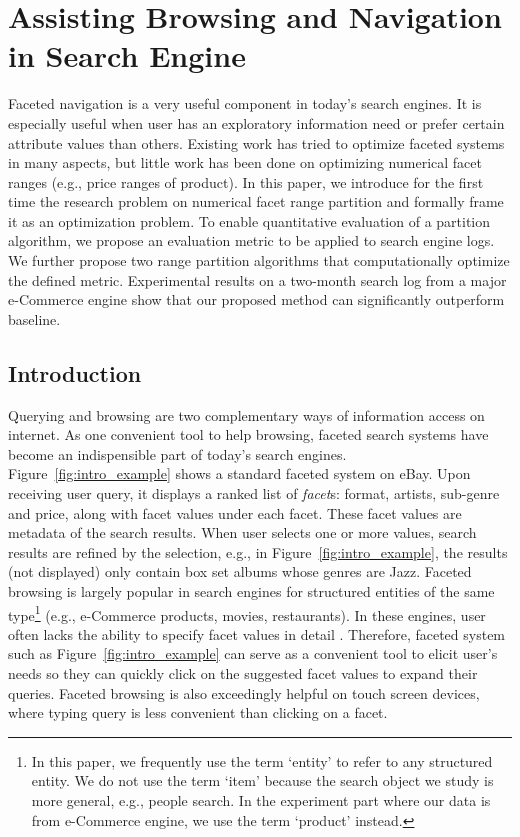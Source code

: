 
\chapter{Assisting Browsing and Navigation in Search Engine}
\label{ch:browsing}

Faceted navigation is a very useful component in today's search engines. It is especially useful when user has an exploratory information need or prefer certain attribute values than others. Existing work has tried to optimize faceted systems in many aspects, but little work has been done on optimizing numerical facet ranges (e.g., price ranges of product). In this paper, we introduce for the first time the research problem on numerical facet range partition and formally frame it as an optimization problem. To enable quantitative evaluation of a partition algorithm, we propose an evaluation metric to be applied to search engine logs. We further propose two range partition algorithms that computationally optimize the defined metric. Experimental results on a two-month search log from a major e-Commerce engine show that our proposed method can significantly outperform baseline.


\section{Introduction}
\label{sec:intro}

Querying and browsing are two complementary ways of information access on internet. As one convenient tool to help browsing, faceted search systems have become an indispensible part of today's search engines. Figure~\ref{fig:intro_example} shows a standard faceted system on eBay. Upon receiving user query, it displays a ranked list of \emph{facet}s: format, artists, sub-genre and price, along with facet values under each facet. These facet values are metadata of the search results. When user selects one or more values, search results are refined by the selection, e.g., in Figure~\ref{fig:intro_example}, the results (not displayed) only contain box set albums whose genres are Jazz. Faceted browsing is largely popular in search engines for structured entities of the same type\footnote{In this paper, we frequently use the term `entity' to refer to any structured entity. We do not use the term `item' because the search object we study is more general, e.g., people search. In the experiment part where our data is from e-Commerce engine, we use the term `product' instead.} (e.g., e-Commerce products, movies, restaurants). In these engines, user often lacks the ability to specify facet values in detail \cite{1555452}. Therefore, faceted system such as Figure~\ref{fig:intro_example} can serve as a convenient tool to elicit user's needs so they can quickly click on the suggested facet values to expand their queries. Faceted browsing is also exceedingly helpful on touch screen devices, where typing query is less convenient than clicking on a facet.

